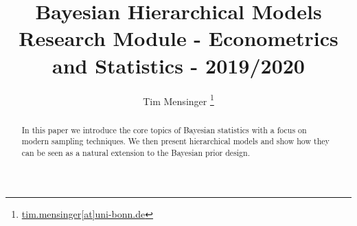 \documentclass[a4paper,11.5pt]{article}
\title{\textbf{Bayesian Hierarchical Models}\\
\large Research Module - Econometrics and Statistics - 2019/2020
}
\date{}
\author{Tim Mensinger%
  \thanks{\href{mailto:tim.mensinger@uni-bonn.de}{tim.mensinger[at]uni-bonn.de}}}
\affil{University of Bonn}
\begin{document}
\setlength{\abovedisplayskip}{-20pt}
\setlength{\belowdisplayskip}{0pt}
\setlength{\abovedisplayshortskip}{0pt}
\setlength{\belowdisplayshortskip}{0pt}
\onehalfspacing

\thispagestyle{empty}
\maketitle
\begin{abstract}
  In this paper we introduce the core topics of Bayesian statistics with a focus on modern sampling techniques.
  We then present hierarchical models and show how they can be seen as a natural extension to the Bayesian prior design.
\end{abstract}

\newpage
\setcounter{tocdepth}{2}
\tableofcontents
\newpage

\pagestyle{plain}






\appendix

\end{document}

